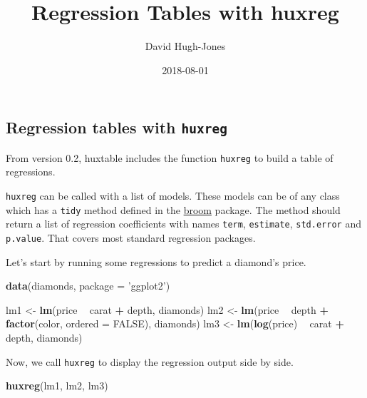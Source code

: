 \documentclass[]{article}
\title{Regression Tables with huxreg}
\author{David Hugh-Jones}
\date{2018-08-01}
\newenvironment{Shaded}{\begin{snugshade}}{\end{snugshade}}
\newcommand{\KeywordTok}[1]{\textcolor[rgb]{0.13,0.29,0.53}{\textbf{#1}}}
\newcommand{\DataTypeTok}[1]{\textcolor[rgb]{0.13,0.29,0.53}{#1}}
\newcommand{\StringTok}[1]{\textcolor[rgb]{0.31,0.60,0.02}{#1}}
\newcommand{\OtherTok}[1]{\textcolor[rgb]{0.56,0.35,0.01}{#1}}
\newcommand{\OperatorTok}[1]{\textcolor[rgb]{0.81,0.36,0.00}{\textbf{#1}}}
\newcommand{\NormalTok}[1]{#1}
\begin{document}
\maketitle

\subsection{\texorpdfstring{Regression tables with
\texttt{huxreg}}{Regression tables with huxreg}}\label{regression-tables-with-huxreg}

From version 0.2, huxtable includes the function \texttt{huxreg} to
build a table of regressions.

\texttt{huxreg} can be called with a list of models. These models can be
of any class which has a \texttt{tidy} method defined in the
\href{https://cran.r-project.org/?package=broom}{broom} package. The
method should return a list of regression coefficients with names
\texttt{term}, \texttt{estimate}, \texttt{std.error} and
\texttt{p.value}. That covers most standard regression packages.

Let's start by running some regressions to predict a diamond's price.

\begin{Shaded}
\begin{Highlighting}[]
\KeywordTok{data}\NormalTok{(diamonds, }\DataTypeTok{package =} \StringTok{'ggplot2'}\NormalTok{)}

\NormalTok{lm1 <-}\StringTok{ }\KeywordTok{lm}\NormalTok{(price }\OperatorTok{~}\StringTok{ }\NormalTok{carat }\OperatorTok{+}\StringTok{ }\NormalTok{depth, diamonds)}
\NormalTok{lm2 <-}\StringTok{ }\KeywordTok{lm}\NormalTok{(price }\OperatorTok{~}\StringTok{ }\NormalTok{depth }\OperatorTok{+}\StringTok{ }\KeywordTok{factor}\NormalTok{(color, }\DataTypeTok{ordered =} \OtherTok{FALSE}\NormalTok{), diamonds)}
\NormalTok{lm3 <-}\StringTok{ }\KeywordTok{lm}\NormalTok{(}\KeywordTok{log}\NormalTok{(price) }\OperatorTok{~}\StringTok{ }\NormalTok{carat }\OperatorTok{+}\StringTok{ }\NormalTok{depth, diamonds)}
\end{Highlighting}
\end{Shaded}

\FloatBarrier

Now, we call \texttt{huxreg} to display the regression output side by
side.

\begin{Shaded}
\begin{Highlighting}[]
\KeywordTok{huxreg}\NormalTok{(lm1, lm2, lm3)}
\end{Highlighting}
\end{Shaded}
\end{document}
